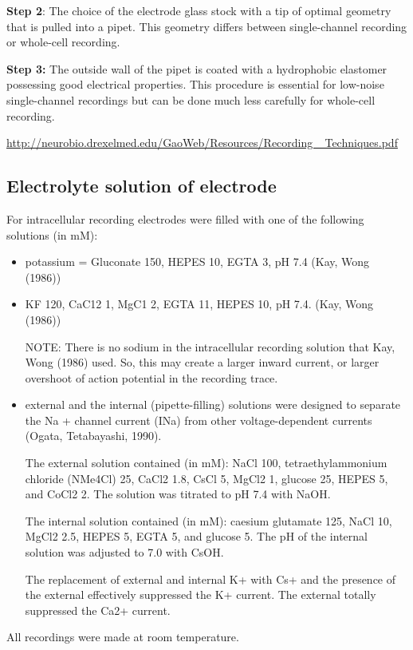 {\bf Step 2}: The choice of the electrode glass stock with a tip of optimal
geometry that is pulled into a pipet. This geometry differs between
single-channel recording or whole-cell recording.


{\bf Step 3:} The outside wall of the pipet is coated with a hydrophobic
elastomer possessing good electrical properties. This procedure is essential for
low-noise single-channel recordings but can be done much less carefully for
whole-cell recording.

\url{http://neurobio.drexelmed.edu/GaoWeb/Resources/Recording _Techniques.pdf}

\subsection{Electrolyte solution of electrode}
\label{sec:electrode-electrolyte-solution}


For intracellular recording electrodes were filled with one of the following
solutions (in mM):
\begin{itemize}
  \item potassium = Gluconate 150, HEPES 10, EGTA 3, pH 7.4 (Kay, Wong (1986))

  \item KF 120, CaC12 1, MgC1 2, EGTA 11, HEPES 10, pH 7.4. (Kay, Wong (1986))

NOTE: There is no sodium in the intracellular recording solution that Kay, Wong
(1986) used. So, this may create a larger inward current, or larger overshoot of
action potential in the recording trace.

  \item external and the internal (pipette-filling) solutions were designed to
  separate the Na + channel current (INa) from other voltage-dependent currents
  (Ogata, Tetabayashi, 1990).

The external solution contained (in mM): NaCl 100, tetraethylammonium chloride
(NMe4Cl) 25, CaCl2 1.8, CsCl 5, MgCl2 1, glucose 25, HEPES 5, and CoCl2 2.
The solution was titrated to pH 7.4 with NaOH.

The internal solution contained (in mM): caesium glutamate 125, NaCl 10, MgCl2
2.5, HEPES 5, EGTA 5, and glucose 5. The pH of the internal solution was
adjusted to 7.0 with CsOH.

The replacement of external and internal K+ with Cs+ and the presence of the
external  effectively suppressed the K+ current.
The external  totally suppressed the Ca2+ current.

\end{itemize}
All recordings were made at room temperature.

